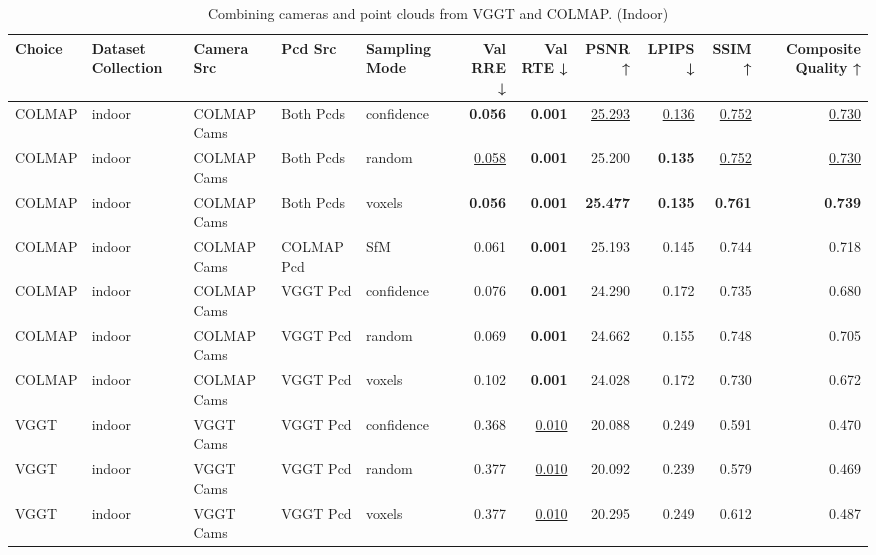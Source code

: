 \begin{table}[H]
\caption{\ifdefined\customcaption \customcaption \else Combining cameras and point clouds from VGGT and COLMAP. (Indoor) \fi}
\label{tab:07_combined_single_indoor}
\centering
\tiny
\begin{tabular}{lllllrrrrrr}
\toprule
Choice & Dataset Collection & Camera Src & Pcd Src & Sampling Mode & Val RRE ↓ & Val RTE ↓ & PSNR ↑ & LPIPS ↓ & SSIM ↑ & Composite Quality ↑ \\
\midrule
COLMAP & indoor & COLMAP Cams & Both Pcds & confidence & \textbf{0.056} & \textbf{0.001} & \underline{25.293} & \underline{0.136} & \underline{0.752} & \underline{0.730} \\
COLMAP & indoor & COLMAP Cams & Both Pcds & random & \underline{0.058} & \textbf{0.001} & 25.200 & \textbf{0.135} & \underline{0.752} & \underline{0.730} \\
COLMAP & indoor & COLMAP Cams & Both Pcds & voxels & \textbf{0.056} & \textbf{0.001} & \textbf{25.477} & \textbf{0.135} & \textbf{0.761} & \textbf{0.739} \\
COLMAP & indoor & COLMAP Cams & COLMAP Pcd & SfM & 0.061 & \textbf{0.001} & 25.193 & 0.145 & 0.744 & 0.718 \\
COLMAP & indoor & COLMAP Cams & VGGT Pcd & confidence & 0.076 & \textbf{0.001} & 24.290 & 0.172 & 0.735 & 0.680 \\
COLMAP & indoor & COLMAP Cams & VGGT Pcd & random & 0.069 & \textbf{0.001} & 24.662 & 0.155 & 0.748 & 0.705 \\
COLMAP & indoor & COLMAP Cams & VGGT Pcd & voxels & 0.102 & \textbf{0.001} & 24.028 & 0.172 & 0.730 & 0.672 \\
VGGT & indoor & VGGT Cams & VGGT Pcd & confidence & 0.368 & \underline{0.010} & 20.088 & 0.249 & 0.591 & 0.470 \\
VGGT & indoor & VGGT Cams & VGGT Pcd & random & 0.377 & \underline{0.010} & 20.092 & 0.239 & 0.579 & 0.469 \\
VGGT & indoor & VGGT Cams & VGGT Pcd & voxels & 0.377 & \underline{0.010} & 20.295 & 0.249 & 0.612 & 0.487 \\
\bottomrule
\end{tabular}
\end{table}